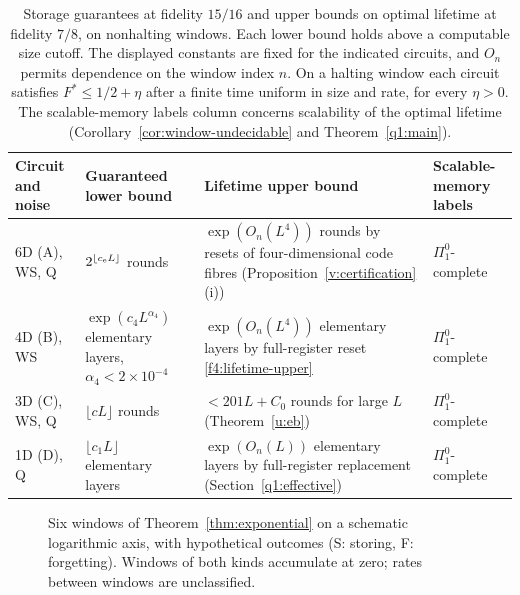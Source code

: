 \begin{table}[!tb]
\caption{Storage guarantees at fidelity \(15/16\) and upper bounds on optimal lifetime at fidelity \(7/8\), on nonhalting windows. Each lower bound holds above a computable size cutoff. The displayed constants are fixed for the indicated circuits, and \(O_n\) permits dependence on the window index \(n\). On a halting window each circuit satisfies \(F^*\le1/2+\eta\) after a finite time uniform in size and rate, for every \(\eta>0\). The scalable-memory labels column concerns scalability of the optimal lifetime (Corollary~\ref{cor:window-undecidable} and Theorem~\ref{q1:main}).}\label{tab:results}
\centering\small\setlength{\tabcolsep}{5pt}
\begin{tabular}{@{}>{\raggedright\arraybackslash}p{.16\linewidth}>{\raggedright\arraybackslash}p{.23\linewidth}>{\raggedright\arraybackslash}p{.29\linewidth}>{\raggedright\arraybackslash}p{.23\linewidth}@{}}
\toprule Circuit and noise & Guaranteed lower bound & Lifetime upper bound & Scalable-memory labels\\\midrule
6D (A), WS, Q & \(2^{\lfloor c_{\rm e}L\rfloor}\) rounds & \(\exp(O_n(L^4))\) rounds by resets of four-dimensional code fibres (Proposition~\ref{v:certification}(i)) & \(\Pi^0_1\)-complete\\\addlinespace[4pt]
4D (B), WS & \(\exp(c_4L^{\alpha_4})\) elementary layers, \(\alpha_4<2\times10^{-4}\) & \(\exp(O_n(L^4))\) elementary layers by full-register reset \eqref{f4:lifetime-upper} & \(\Pi^0_1\)-complete\\\addlinespace[4pt]
3D (C), WS, Q & \(\lfloor cL\rfloor\) rounds & \(<201L+C_0\) rounds for large \(L\) (Theorem~\ref{u:eb}) & \(\Pi^0_1\)-complete\\\addlinespace[4pt]
1D (D), Q & \(\lfloor c_1L\rfloor\) elementary layers & \(\exp(O_n(L))\) elementary layers by full-register replacement (Section~\ref{q1:effective}) & \(\Pi^0_1\)-complete\\\bottomrule
\end{tabular}
\end{table}

\begin{figure}[!tb]
\centering
\caption{Six windows of Theorem~\ref{thm:exponential} on a schematic logarithmic axis, with hypothetical outcomes (S: storing, F: forgetting). Windows of both kinds accumulate at zero; rates between windows are unclassified.}\label{fig:rates}
\end{figure}

